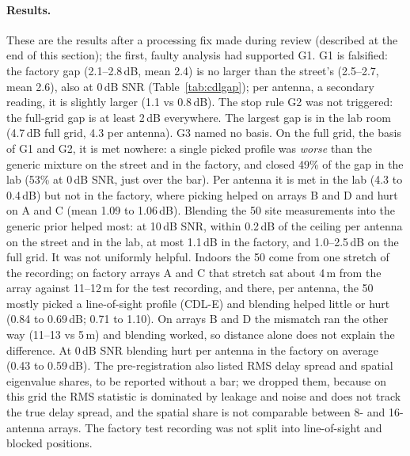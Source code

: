 \documentclass[11pt]{article}
\begin{document}
\paragraph{Results.} These are the results after a processing fix made
during review (described at the end of this section); the first, faulty
analysis had supported G1. G1 is falsified: the factory gap (2.1--2.8\,dB,
mean 2.4) is no larger than the street's (2.5--2.7, mean 2.6), also at 0\,dB
SNR (Table~\ref{tab:cdlgap}); per antenna, a secondary reading, it is
slightly larger (1.1 vs 0.8\,dB). The stop rule G2 was not triggered: the
full-grid gap is at least 2\,dB everywhere. The largest gap is in the lab room
(4.7\,dB full grid, 4.3 per antenna). G3 named no basis. On the full grid, the
basis of G1 and G2, it is met nowhere: a single picked profile was
\emph{worse} than the generic mixture on the street and in the factory, and
closed 49\% of the gap in the lab (53\% at 0\,dB SNR, just over the bar). Per
antenna it is met in the lab (4.3 to 0.4\,dB) but not in the factory, where
picking helped on arrays B and D and hurt on A and C (mean 1.09 to 1.06\,dB).
Blending the 50 site measurements into the generic prior helped most: at
10\,dB SNR, within 0.2\,dB of the ceiling per antenna on the street and in the
lab, at most 1.1\,dB in the factory, and 1.0--2.5\,dB on the full grid. It was
not uniformly helpful. Indoors the 50 come from one stretch of the recording;
on factory arrays A and C that stretch sat about 4\,m from the array against
11--12\,m for the test recording, and there, per antenna, the 50 mostly picked
a line-of-sight profile (CDL-E) and blending helped little or hurt (0.84 to
0.69\,dB; 0.71 to 1.10). On arrays B and D the mismatch ran the other way
(11--13 vs 5\,m) and blending worked, so distance alone does not explain the
difference. At 0\,dB SNR blending hurt per antenna in the factory on average
(0.43 to 0.59\,dB). The pre-registration also listed RMS delay spread and
spatial eigenvalue shares, to be reported without a bar; we dropped them,
because on this grid the RMS statistic is dominated by leakage and noise and
does not track the true delay spread, and the spatial share is not comparable
between 8- and 16-antenna arrays. The factory test recording was not split
into line-of-sight and blocked positions.
\end{document}
